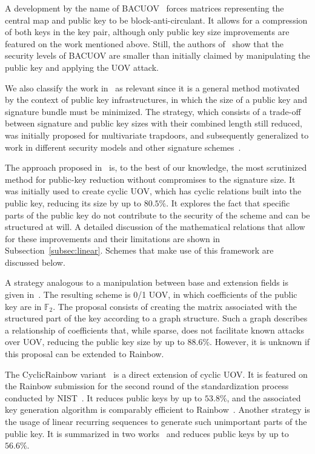 \documentclass[12pt, a4paper, oneside]{memoir}
\theoremstyle{definition}
\begin{document}
A development by the name of BACUOV~\cite{Szepieniec:201908} forces matrices representing the central map and public key to be block-anti-circulant. It allows for a compression of both keys in the key pair, although only public key size improvements are featured on the work mentioned above. Still, the authors of~\cite{Furue:202004} show that the security levels of BACUOV are smaller than initially claimed by manipulating the public key and applying the UOV attack.

We also classify the work in~\cite{Szepieniec:201706} as relevant since it is a general method motivated by the context of public key infrastructures, in which the size of a public key and signature bundle must be minimized. The strategy, which consists of a trade-off between signature and public key sizes with their combined length still reduced, was initially proposed for multivariate trapdoors, and subsequently generalized to work in different security models and other signature schemes~\cite{Beullens:201808}.

The approach proposed in~\cite{Petzoldt:201006} is, to the best of our knowledge, the most scrutinized method for public-key reduction without compromises to the signature size. It was initially used to create cyclic UOV, which has cyclic relations built into the public key, reducing its size by up to $80.5\%$. It explores the fact that specific parts of the public key do not contribute to the security of the scheme and can be structured at will. A detailed discussion of the mathematical relations that allow for these improvements and their limitations are shown in Subsection~\ref{subsec:linear}. Schemes that make use of this framework are discussed below.

A strategy analogous to a manipulation between base and extension fields is given in~\cite{Petzoldt:201109}. The resulting scheme is 0/1 UOV, in which coefficients of the public key are in $\mathbb{F}_{2}$. The proposal consists of creating the matrix associated with the structured part of the key according to a graph structure. Such a graph describes a relationship of coefficients that, while sparse, does not facilitate known attacks over UOV, reducing the public key size by up to $88.6\%$. However, it is unknown if this proposal can be extended to Rainbow.

The CyclicRainbow variant~\cite{Petzoldt:201012} is a direct extension of cyclic UOV. It is featured on the Rainbow submission for the second round of the standardization process conducted by NIST~\cite{Ding:201901}. It reduces public keys by up to $53.8\%$, and the associated key generation algorithm is comparably efficient to Rainbow~\cite{Petzoldt:202004}. Another strategy is the usage of linear recurring sequences to generate such unimportant parts of the public key. It is summarized in two works~\cite{Petzoldt:201103,Petzoldt:201211} and reduces public keys by up to $56.6\%$.
\end{document}
